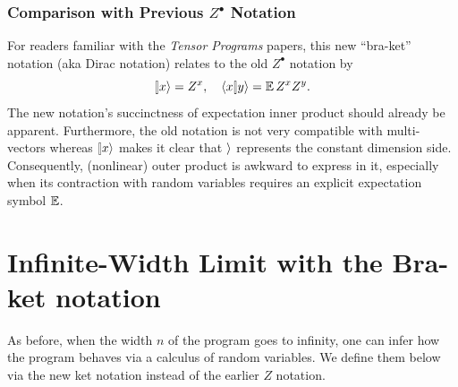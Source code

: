 \documentclass{article}
\theoremstyle{plain}
\theoremstyle{definition}
\begin{document}
\subsubsection{Comparison with Previous $Z^\bullet$ Notation}
For readers familiar with the \emph{Tensor Programs} papers, this new ``bra-ket'' notation
(aka Dirac notation) relates to the old $Z^\bullet$ notation by
\[
\ket x= Z^{x},\quad\braket xy=\EV Z^{x}Z^{y}.
\]
The new notation's succinctness of expectation inner product should already be apparent.
Furthermore, the old notation is not very compatible with multi-vectors whereas $\ket x$ makes it clear that $\rangle$ represents the constant dimension side.
Consequently, (nonlinear) outer product is awkward to express in it, especially when its contraction with random variables requires an explicit expectation symbol $\operatorname*{\mathbb{E}}$.

    

\section{Infinite-Width Limit with the Bra-ket notation}\label{sec:tp}
As before, when the width $n$ of the program goes to infinity, one can infer how the program behaves via a calculus of random variables.
We define them below via the new ket notation instead of the earlier $Z$ notation.
\end{document}
